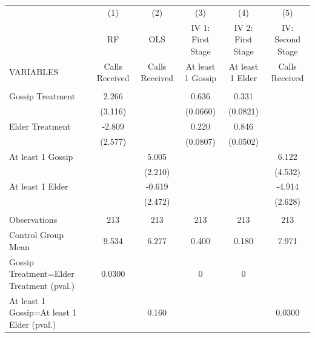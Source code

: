 \begin{tabular}{lccccc} \hline
 & (1) & (2) & (3) & (4) & (5) \\
 & RF & OLS & IV 1: First Stage & IV 2: First Stage & IV: Second Stage \\
VARIABLES & Calls Received & Calls Received & At least 1 Gossip & At least 1 Elder & Calls Received \\ \hline
 &  &  &  &  &  \\
Gossip Treatment & 2.266 &  & 0.636 & 0.331 &  \\
 & (3.116) &  & (0.0660) & (0.0821) &  \\
Elder Treatment & -2.809 &  & 0.220 & 0.846 &  \\
 & (2.577) &  & (0.0807) & (0.0502) &  \\
At least 1 Gossip &  & 5.005 &  &  & 6.122 \\
 &  & (2.210) &  &  & (4.532) \\
At least 1 Elder &  & -0.619 &  &  & -4.914 \\
 &  & (2.472) &  &  & (2.628) \\
 &  &  &  &  &  \\
Observations & 213 & 213 & 213 & 213 & 213 \\
Control Group Mean & 9.534 & 6.277 & 0.400 & 0.180 & 7.971 \\
Gossip Treatment=Elder Treatment (pval.) & 0.0300 &  & 0 & 0 &  \\
 At least 1 Gossip=At least 1 Elder (pval.) &  & 0.160 &  &  & 0.0300 \\ \hline
\end{tabular}

